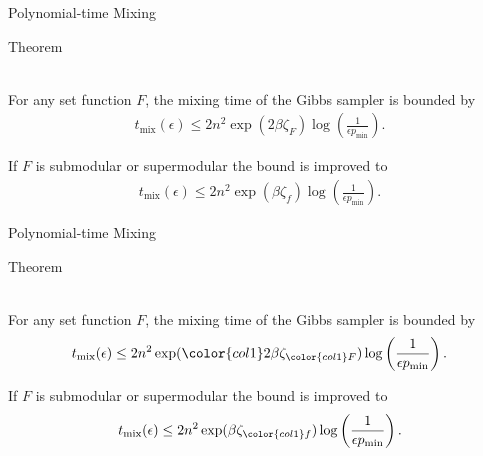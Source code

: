 \documentclass[mathserif]{beamer}
\newcommand{\qtheorem}[1]{%
\begin{tcolorbox}[enhanced jigsaw,size=tight,boxsep=7pt,boxrule=0.7pt,coltext=textcolor,colframe=col2,colback=col1,opacityback=0,opacityframe=1]
\begin{minipage}{\textwidth}
{\color{col2}\strut Theorem}\\[0.7em]
#1
\end{minipage}
\end{tcolorbox}%
}
\begin{document}
\begin{frame}{Polynomial-time Mixing}
\qtheorem{
For any set function $F$, the mixing time of the Gibbs sampler is bounded by
\vspace{-0.5em}
\begin{align*}
t_{\textrm{mix}}(\epsilon) \leq 2n^2 \exp(2\beta\zeta_F)\log\left(\displaystyle\frac{1}{\epsilon p_{\textrm{min}}}\right).
\end{align*}

\vspace{0.5em}
If $F$ is submodular or supermodular the bound is improved to
\vspace{-0.5em}
\begin{align*}
t_{\textrm{mix}}(\epsilon) \leq 2n^2 \exp(\beta\zeta_f)\log\left(\displaystyle\frac{1}{\epsilon p_{\textrm{min}}}\right).
\end{align*}
}
\end{frame}

\begin{frame}{Polynomial-time Mixing}
\qtheorem{
For any set function $F$, the mixing time of the Gibbs sampler is bounded by
\vspace{-0.5em}
\begin{align*}
t_{\textrm{mix}}(\epsilon) \leq 2n^2 \exp({\color{col1}2}\beta\zeta_{\color{col1}F})\log\left(\displaystyle\frac{1}{\epsilon p_{\textrm{min}}}\right).
\end{align*}

\vspace{0.5em}
If $F$ is submodular or supermodular the bound is improved to
\vspace{-0.5em}
\begin{align*}
t_{\textrm{mix}}(\epsilon) \leq 2n^2 \exp(\beta\zeta_{\color{col1}f})\log\left(\displaystyle\frac{1}{\epsilon p_{\textrm{min}}}\right).
\end{align*}
}
\end{frame}
\end{document}
